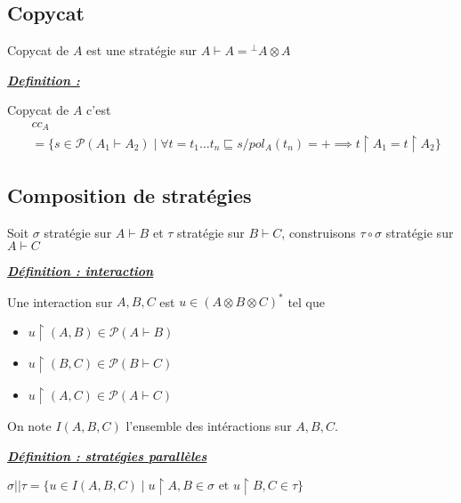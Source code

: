 \documentclass[a4paper,12ptCOUCOU
]{article}
\newlength{\mydepth}
\newlength{\myheight}
\newenvironment{answer}
{\par\begin{lrbox}{\mybox}\quad\begin{minipage}{\linewidth}\color{black}\setlength{\parskip}{10pt plus 1pt minus 1pt}\vspace*{-.7\baselineskip}}
{\end{minipage}\end{lrbox}
\settodepth{\mydepth}{\usebox{\mybox}}
\settoheight{\myheight}{\usebox{\mybox}}
\addtolength{\myheight}{\mydepth}
\noindent\makebox[0pt]{
  \color{gray}\hspace{-0pt}\rule[-\mydepth]{1pt}{\myheight}}
\usebox{\mybox}
  }
\begin{document}
\subsection{Copycat}

Copycat de $A$ est une stratégie sur $A \vdash A = {}^\bot A \otimes A$

\begin{samepage}\textbf{\textit{\underline{ Definition : }}} \begin{answer}
Copycat de $A$ c'est
\begin{align*}
&cc_A\\
&=\{s \in \mathcal{P}(A_1 \vdash A_2) \mid \forall t=t_1 \dots t_n \sqsubseteq s/ pol_A(t_n) = + \implies t \upharpoonright A_1 = t \upharpoonright A_2\}
\end{align*}
\end{answer}\end{samepage}


\subsection{Composition de stratégies}

Soit $\sigma$ stratégie sur $A\vdash B$ et $\tau$ stratégie sur $B \vdash C$,
construisons $\tau \circ \sigma$ stratégie sur $A \vdash C$

\begin{samepage}\textbf{\textit{\underline{ Définition : interaction }}} \begin{answer}

Une interaction sur $A, B, C$ est $u \in (A \otimes B \otimes C)^*$ tel que
\begin{itemize}
\item $u \upharpoonright (A, B) \in \mathcal{P}(A \vdash B)$
\item $u \upharpoonright (B, C) \in \mathcal{P}(B \vdash C)$
\item $u \upharpoonright (A, C) \in \mathcal{P}(A \vdash C)$
\end{itemize}
\end{answer}\end{samepage}
On note $I(A,B,C)$ l'ensemble des intéractions sur $A,B,C$.

\begin{samepage}\textbf{\textit{\underline{ Définition : stratégies parallèles }}} \begin{answer}
$\sigma || \tau = \{u \in I(A,B,C) \mid u \upharpoonright A,B \in \sigma \text{ et }u \upharpoonright B,C \in \tau\}$
\end{answer}\end{samepage}
\end{document}
